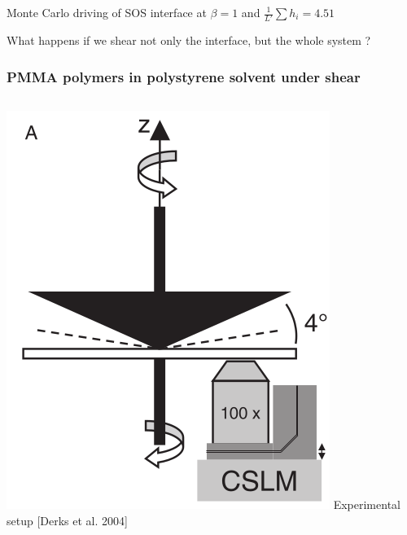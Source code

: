 \documentclass[9pt, dvipsnames]{beamer} %
\begin{document}
\begin{frame}
\begin{overprint}
	    {\small Monte Carlo driving of SOS interface at $\beta=1$ and $\frac{1}{L'}\sum h_i = 4.51$ }
	    \end{overprint}
\end{frame}


\begin{frame}
	\centering
	\huge What happens if we shear not only the interface, but the whole system ?
\end{frame}

\begin{frame}
    \frametitle{PMMA polymers in polystyrene solvent under shear \newline [Derks et al. 2006]}
    \begin{overprint}
	    \begin{columns}
	    \includegraphics[width=\linewidth]{derks-setups.png}
	    Experimental setup [Derks et al. 2004]

\end{columns}
\end{overprint}
\end{frame}
\end{document}
